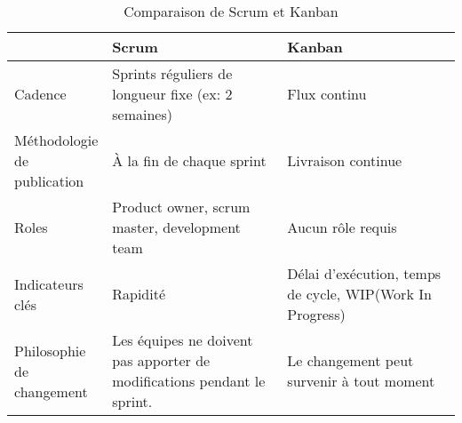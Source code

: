         \par    
\begin{table}
        \centering
        \begin{tabular}{|p{0.20\linewidth}|p{0.40\linewidth}|p{0.40\linewidth}|}
        \hline
                \textbf{} & \textbf{Scrum}& \textbf{Kanban}  \\
                \hline
                Cadence &
                Sprints réguliers de longueur fixe (ex: 2 semaines)&
                Flux continu
                \\
                \hline
                Méthodologie de publication&
                À la fin de chaque sprint&
                Livraison continue
                    \\
                \hline
                Roles &
                Product owner, scrum master, development team&
                Aucun rôle requis
                    \\
                \hline
                Indicateurs clés&
                Rapidité&
                Délai d'exécution, temps de cycle, WIP(Work In Progress)
                    \\
                \hline
                Philosophie de changement&
                Les équipes ne doivent pas apporter de modifications pendant le sprint.&
                Le changement peut survenir à tout moment
                        \\

                \hline 
        \end{tabular}
        \caption{Comparaison de Scrum et Kanban} \label{tab:scrumvskanban}
\end{table}
\par
        